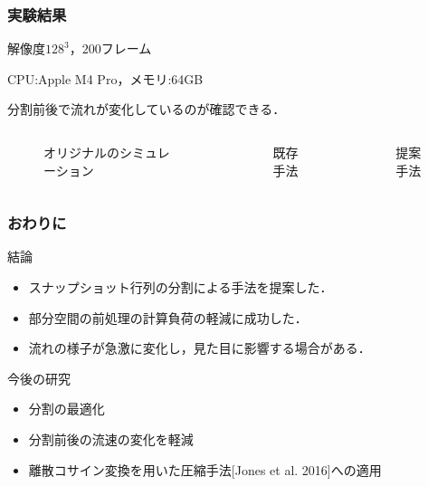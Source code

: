\documentclass[aspectratio=169,dvipdfmx,hyperref={bookmarks=true}]{beamer}
\begin{document}
 \begin{frame}
 \frametitle{実験結果}
\begin{block}{}
解像度$128^3$，$200$フレーム

CPU:Apple M4 Pro，メモリ:64GB

分割前後で流れが変化しているのが確認できる．
\end{block}
\begin{columns}
    \begin{column}{0.33\textwidth}
   \begin{figure}
\caption{オリジナルのシミュレーション}
   \end{figure}
    \end{column}
    \begin{column}{0.33\textwidth}
       \begin{figure}
\caption{既存手法}
   \end{figure}
    \end{column}
    \begin{column}{0.33\textwidth}
       \begin{figure}
\caption{提案手法}
   \end{figure}
    \end{column}
\end{columns}
\end{frame}
  
 \begin{frame}
 \frametitle{おわりに}
\begin{block}{結論}
\begin{itemize}
	\item スナップショット行列の分割による手法を提案した．
	\item 部分空間の前処理の計算負荷の軽減に成功した．
	\item 流れの様子が急激に変化し，見た目に影響する場合がある．
\end{itemize}
\end{block}
\begin{block}{今後の研究}
\begin{itemize}
	\item 分割の最適化
	\item 分割前後の流速の変化を軽減
	\item 離散コサイン変換を用いた圧縮手法[Jones et al. 2016]への適用
\end{itemize}
\end{block}
\end{frame}
\end{document}
